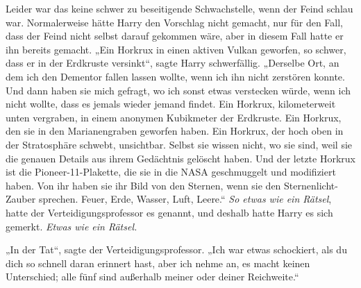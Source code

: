 Leider war das keine schwer zu beseitigende Schwachstelle, wenn der Feind schlau war. Normalerweise hätte Harry den Vorschlag nicht gemacht, nur für den Fall, dass der Feind nicht selbst darauf gekommen wäre, aber in diesem Fall hatte er ihn bereits gemacht.
„Ein Horkrux in einen aktiven Vulkan geworfen, so schwer, dass er in der Erdkruste versinkt“, sagte Harry schwerfällig.
„Derselbe Ort, an dem ich den Dementor fallen lassen wollte, wenn ich ihn nicht zerstören konnte. Und dann haben sie mich gefragt, wo ich sonst etwas verstecken würde, wenn ich nicht wollte, dass es jemals wieder jemand findet. Ein Horkrux, kilometerweit unten vergraben, in einem anonymen Kubikmeter der Erdkruste. Ein Horkrux, den sie in den Marianengraben geworfen haben. Ein Horkrux, der hoch oben in der Stratosphäre schwebt, unsichtbar. Selbst sie wissen nicht, wo sie sind, weil sie die genauen Details aus ihrem Gedächtnis gelöscht haben. Und der letzte Horkrux ist die Pioneer-11-Plakette, die sie in die NASA geschmuggelt und modifiziert haben. Von ihr haben sie ihr Bild von den Sternen, wenn sie den Sternenlicht-Zauber sprechen. Feuer, Erde, Wasser, Luft, Leere.“
\emph{So etwas wie ein Rätsel}, hatte der Verteidigungsprofessor es genannt, und deshalb hatte Harry es sich gemerkt.
\emph{Etwas wie ein Rätsel.}%

„In der Tat“, sagte der Verteidigungsprofessor.
„Ich war etwas schockiert, als du dich so schnell daran erinnert hast, aber ich nehme an, es macht keinen Unterschied; alle fünf sind außerhalb meiner oder deiner Reichweite.“

